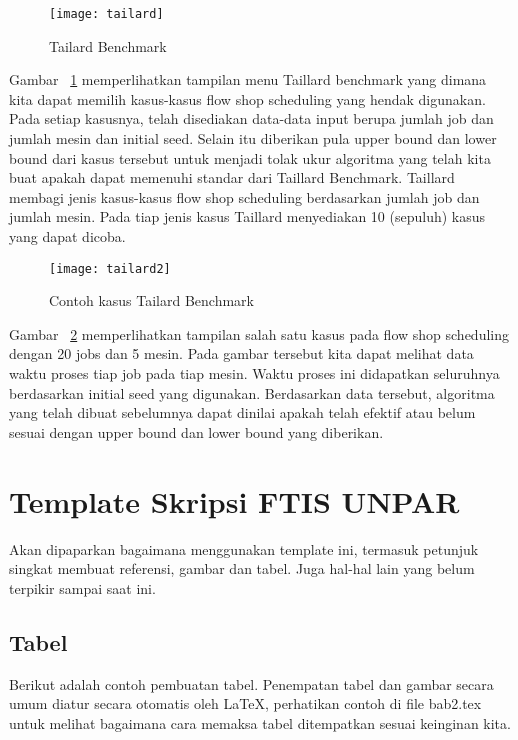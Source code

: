 \begin{figure}[H]
	\centering
	\texttt{[image: tailard]}
	\caption[Tailard Benchmark] {Tailard Benchmark}
	\label{fig:tailard1}
\end{figure}
Gambar ~\ref{fig:tailard1} memperlihatkan tampilan menu Taillard benchmark yang dimana kita dapat memilih
kasus-kasus flow shop scheduling yang hendak digunakan. Pada setiap kasusnya, telah disediakan
data-data input berupa jumlah job dan jumlah mesin dan initial seed. Selain itu diberikan
pula upper bound dan lower bound dari kasus tersebut untuk menjadi tolak ukur algoritma yang
telah kita buat apakah dapat memenuhi standar dari Taillard Benchmark.
Taillard membagi jenis kasus-kasus flow shop scheduling berdasarkan jumlah job dan jumlah
mesin. Pada tiap jenis kasus Taillard menyediakan 10 (sepuluh) kasus yang dapat dicoba.
\begin{figure}[H]
	\centering
	\texttt{[image: tailard2]}
	\caption[Contoh kasus Tailard Benchmark] {Contoh kasus Tailard Benchmark}
	\label{fig:tailard2}
\end{figure}
Gambar ~\ref{fig:tailard2} memperlihatkan tampilan salah satu kasus pada flow shop scheduling dengan 20
jobs dan 5 mesin. Pada gambar tersebut kita dapat melihat data waktu proses tiap job pada
tiap mesin. Waktu proses ini didapatkan seluruhnya berdasarkan initial seed yang digunakan.
Berdasarkan data tersebut, algoritma yang telah dibuat sebelumnya dapat dinilai apakah telah 
efektif atau belum sesuai dengan upper bound dan lower bound yang diberikan.


















\iffalse

\section{Template Skripsi FTIS UNPAR}
\label{sec:template}
 
Akan dipaparkan bagaimana menggunakan template ini, termasuk petunjuk singkat membuat referensi, gambar dan tabel.
Juga hal-hal lain yang belum terpikir sampai saat ini. 
 


\subsection{Tabel}  
Berikut adalah contoh pembuatan tabel. 
Penempatan tabel dan gambar secara umum diatur secara otomatis oleh \LaTeX{}, perhatikan contoh di file bab2.tex untuk melihat bagaimana cara memaksa tabel ditempatkan sesuai keinginan kita.

